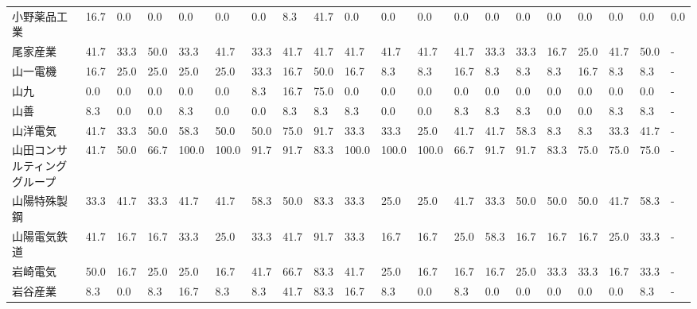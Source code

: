 \begin{tabular}{llllllllllllllllllll}
小野薬品工業          &   16.7 &    0.0 &       0.0 &       0.0 &        0.0 &    0.0 &    8.3 &   41.7 &     0.0 &     0.0 &    0.0 &   0.0 &    0.0 &     0.0 &     0.0 &   0.0 &   0.0 &   0.0 &   0.0 \\
尾家産業            &   41.7 &   33.3 &      50.0 &      33.3 &       41.7 &   33.3 &   41.7 &   41.7 &    41.7 &    41.7 &   41.7 &  41.7 &   33.3 &    33.3 &    16.7 &  25.0 &  41.7 &  50.0 &     - \\
山一電機            &   16.7 &   25.0 &      25.0 &      25.0 &       25.0 &   33.3 &   16.7 &   50.0 &    16.7 &     8.3 &    8.3 &  16.7 &    8.3 &     8.3 &     8.3 &  16.7 &   8.3 &   8.3 &     - \\
山九              &    0.0 &    0.0 &       0.0 &       0.0 &        0.0 &    8.3 &   16.7 &   75.0 &     0.0 &     0.0 &    0.0 &   0.0 &    0.0 &     0.0 &     0.0 &   0.0 &   0.0 &   0.0 &     - \\
山善              &    8.3 &    0.0 &       0.0 &       8.3 &        0.0 &    0.0 &    8.3 &    8.3 &     8.3 &     0.0 &    0.0 &   8.3 &    8.3 &     8.3 &     0.0 &   0.0 &   8.3 &   8.3 &     - \\
山洋電気            &   41.7 &   33.3 &      50.0 &      58.3 &       50.0 &   50.0 &   75.0 &   91.7 &    33.3 &    33.3 &   25.0 &  41.7 &   41.7 &    58.3 &     8.3 &   8.3 &  33.3 &  41.7 &     - \\
山田コンサルティンググループ  &   41.7 &   50.0 &      66.7 &     100.0 &      100.0 &   91.7 &   91.7 &   83.3 &   100.0 &   100.0 &  100.0 &  66.7 &   91.7 &    91.7 &    83.3 &  75.0 &  75.0 &  75.0 &     - \\
山陽特殊製鋼          &   33.3 &   41.7 &      33.3 &      41.7 &       41.7 &   58.3 &   50.0 &   83.3 &    33.3 &    25.0 &   25.0 &  41.7 &   33.3 &    50.0 &    50.0 &  50.0 &  41.7 &  58.3 &     - \\
山陽電気鉄道          &   41.7 &   16.7 &      16.7 &      33.3 &       25.0 &   33.3 &   41.7 &   91.7 &    33.3 &    16.7 &   16.7 &  25.0 &   58.3 &    16.7 &    16.7 &  16.7 &  25.0 &  33.3 &     - \\
岩崎電気            &   50.0 &   16.7 &      25.0 &      25.0 &       16.7 &   41.7 &   66.7 &   83.3 &    41.7 &    25.0 &   16.7 &  16.7 &   16.7 &    25.0 &    33.3 &  33.3 &  16.7 &  33.3 &     - \\
岩谷産業            &    8.3 &    0.0 &       8.3 &      16.7 &        8.3 &    8.3 &   41.7 &   83.3 &    16.7 &     8.3 &    0.0 &   8.3 &    0.0 &     0.0 &     0.0 &   0.0 &   0.0 &   8.3 &     - \\

\end{tabular}
